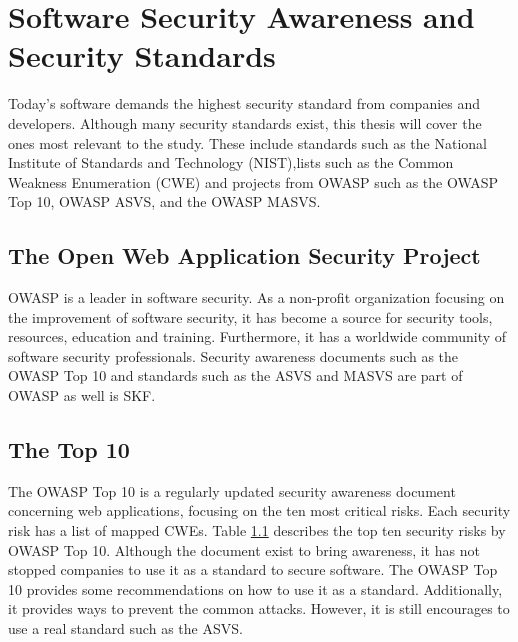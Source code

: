 \section{Software Security Awareness and Security Standards}
Today's software demands the highest security standard from companies and developers. Although many security standards exist, this thesis will cover the ones most relevant to the study. These include standards such as the National Institute of Standards and Technology (NIST),lists such as the Common Weakness Enumeration (CWE) and projects from OWASP such as the OWASP Top 10, OWASP ASVS, and the OWASP MASVS. 

\subsection{The Open Web Application Security Project}
OWASP is a leader in software security. As a non-profit organization focusing on the improvement of software security, it has become a source for security tools, resources, education and training. Furthermore, it has a worldwide community of software security professionals. Security awareness documents such as the OWASP Top 10 and standards such as the ASVS and MASVS are part of OWASP as well is SKF.

\subsection{The Top 10}\label{sec:owasp-top-10}
The OWASP Top 10 is a regularly updated security awareness document concerning web applications, focusing on the ten most critical risks. Each security risk has a list of mapped CWEs. Table \ref{} describes the top ten security risks by OWASP Top 10. Although the document exist to bring awareness, it has not stopped companies to use it as a standard to secure software. The OWASP Top 10 provides some recommendations on how to use it as a standard. Additionally, it provides ways to prevent the common attacks. However, it is still encourages to use a real standard such as the ASVS.

